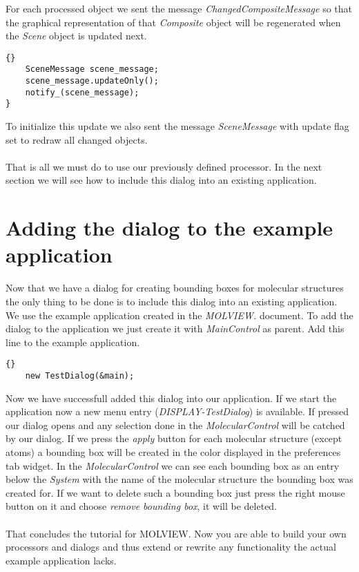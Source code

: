 For each processed object we sent the message {\em ChangedCompositeMessage} so
that the graphical representation of that {\em Composite} object will be regenerated
when the {\em Scene} object is updated next.			

\begin{lstlisting}{}
	SceneMessage scene_message;
	scene_message.updateOnly();
	notify_(scene_message);
}
\end{lstlisting}

To initialize this update we also sent the message {\em SceneMessage} with 
update flag set to redraw all changed objects.\\ \\

That is all we must do to use our previously defined processor. In the next section
we will see how to include this dialog into an existing application.



\section{Adding the dialog to the example application}
\label{section:adding_the_dialog}

Now that we have a dialog for creating bounding boxes for molecular structures
the only thing to be done is to include this dialog into an existing application.
We use the example application created in the {\em MOLVIEW.} document.
To add the dialog to the application we just create it with {\em MainControl}
as parent. Add this line to the example application.

\begin{lstlisting}{}
	new TestDialog(&main);
\end{lstlisting}

Now we have successfull added this dialog into our application. If we start the
application now a new menu entry ({\em DISPLAY-TestDialog}) is available. If pressed our dialog opens and
any selection done in the {\em MolecularControl} will be catched by our dialog. If we press
the {\em apply} button for each molecular structure (except atoms) a bounding box
will be created in the color displayed in the preferences tab widget. In the {\em MolecularControl}
we can see each bounding box as an entry below the {\em System} with the name of
the molecular structure the bounding box was created for.
If we want to delete such a bounding box just press the right mouse button on it and
choose {\em remove bounding box}, it will be deleted.\\ \\

That concludes the tutorial for MOLVIEW. Now you are able to build your own
processors and dialogs and thus extend or rewrite any functionality the actual
example application lacks.
